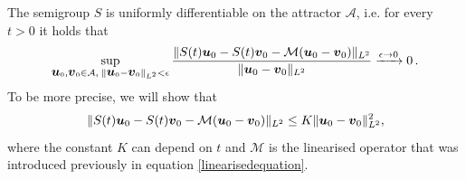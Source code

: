 \documentclass[10pt,a4paper]{amsart}
\newcommand{\Att}{\mathcal{A}}
\newcommand{\bu}{\mbox{\boldmath$u$}}
\newcommand{\bv}{\mbox{\boldmath$v$}}
\begin{document}
\begin{lemma} 
The semigroup $S$ is uniformly differentiable on the attractor $\Att$, i.e. for every $t > 0$ it holds that
\begin{equation*}
\sup_{\bu_0, \bv_0 \in \Att, \; \lVert \bu_0 - \bv_0 \rVert_{L^2} < \epsilon} \frac{\lVert S(t) \bu_0 - S(t) \bv_0 - \mathcal{M} (\bu_0 - \bv_0) \rVert_{L^2}}{\lVert\bu_0 - \bv_0 \rVert_{L^2}} \xrightarrow[]{\epsilon \rightarrow 0} 0\,.
\end{equation*}
To be more precise, we will show that
\begin{equation}
\lVert S(t) \bu_0 - S(t) \bv_0 - \mathcal{M} (\bu_0 - \bv_0) \rVert_{L^2} \leq K \lVert \bu_0 - \bv_0 \rVert_{L^2}^2,
\end{equation}
where the constant $K$ can depend on $t$ and $\mathcal{M}$ is the linearised operator that was introduced previously in equation \eqref{linearisedequation}.
\end{lemma}
\end{document}
